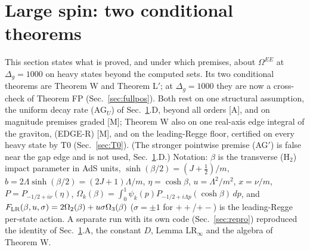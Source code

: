 \documentclass[aps,prl,onecolumn,superscriptaddress,nofootinbib]{revtex4-2}
\begin{document}
\section{Large spin: two conditional theorems}
\label{sec:largespin}

This section states what is proved, and under which premises, about $\Omega^{EE}$ at $\Delta_g=1000$ on heavy
states beyond the computed sets. Its two conditional theorems are Theorem W and Theorem L$'$; at $\Delta_g=1000$ they are now a cross-check of Theorem FP (Sec.~\ref{sec:fullpos}). Both rest on one structural
assumption, the uniform decay rate (AG$_U$) of Sec.~\ref{sec:largespin}.D, beyond all orders [A], and on magnitude premises graded
[M]; Theorem W also on one real-axis edge integral of the graviton, (EDGE-R) [M], and on the leading-Regge floor, certified on every heavy state by T0 (Sec.~\ref{sec:T0}). (The stronger pointwise premise (AG$'$) is false near the gap edge and is not used, Sec.~\ref{sec:largespin}.D.)
Notation: $\beta$ is the transverse (H$_2$) impact parameter in AdS units, $\sinh(\beta/2)=(J+\tfrac12)/m$,
$b=2\Lambda\sinh(\beta/2)=(2J+1)\Lambda/m$, $\eta=\cosh\beta$, $u=\Lambda^2/m^2$, $x=\nu/m$, $P=P_{-1/2+i\nu}(\eta)$,
$\Omega_k(\beta)=\int_0^1\psi_k(p)P_{-1/2+i\Lambda p}(\cosh\beta)\,dp$, and
$F_{\rm LR}(\beta,u,\sigma)=2\Omega_2(\beta)+u\sigma\Omega_3(\beta)$ ($\sigma=\pm1$ for $++$/$+-$) is the leading-Regge
per-state action. A separate run with its own code (Sec.~\ref{sec:repro}) reproduced the
identity of Sec.~\ref{sec:largespin}.A, the constant $D$, Lemma LR$_\infty$ and the algebra of Theorem W.
\end{document}
